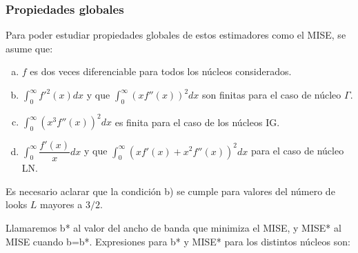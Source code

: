 \subsubsection{Propiedades globales}
\label{PropiedadesGlobales}

Para poder estudiar propiedades globales de estos estimadores como el MISE, se asume que:

\begin{enumerate}[a)]
	\item $f$ es dos veces diferenciable para todos los núcleos considerados.
	\item $\displaystyle{\int_0^{\infty}}  f'^2(x) dx$ y que $\displaystyle{\int_0^{\infty}}  (x f''(x))^2 dx$ son finitas para el caso de núcleo $\Gamma$.
	\item $\displaystyle{\int_0^{\infty}}  (x^3 f''(x))^2 dx$ es finita para el caso de los núcleos IG.
	\item $\displaystyle{\int_0^{\infty}}  \dfrac{f'(x)}{x} dx$ y que $\displaystyle{\int_0^{\infty}}  (x f'(x)+x^2 f''(x))^2 dx$  para el caso de núcleo LN.
\end{enumerate}

Es necesario aclarar que la condición b) se cumple para valores del número de looks $L$ mayores a $3/2$. 

Llamaremos b* al valor del ancho de banda que minimiza el MISE, y MISE* al MISE cuando b=b*. Expresiones para b* y MISE* para los distintos núcleos son:

